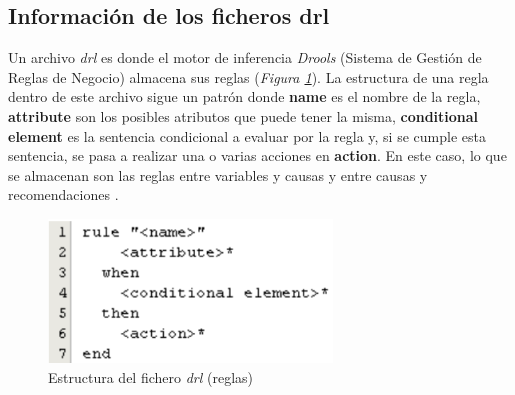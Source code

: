 \subsection{Información de los ficheros drl}
Un archivo \textsl{drl} es donde el motor de inferencia \textsl{Drools} (Sistema de Gestión de Reglas de Negocio) almacena sus reglas (\textsl{Figura \ref{fig:reglas}}). La estructura de una regla dentro de este archivo sigue un patrón donde \textbf{name} es el nombre de la regla, \textbf{attribute} son los posibles atributos que puede tener la misma, \textbf{conditional element} es la sentencia condicional a evaluar por la regla y, si se cumple esta sentencia, se pasa a realizar una o varias acciones en \textbf{action}. En este caso, lo que se almacenan son  las reglas entre variables y causas y entre causas y recomendaciones \cite{Riveron2017}.

\begin{figure}[h]
\centering
 \includegraphics[width=0.5\linewidth]{imagen/rules.png}
 \caption{Estructura del fichero \textsl{drl} (reglas)}
 \label{fig:reglas} 
\end{figure}